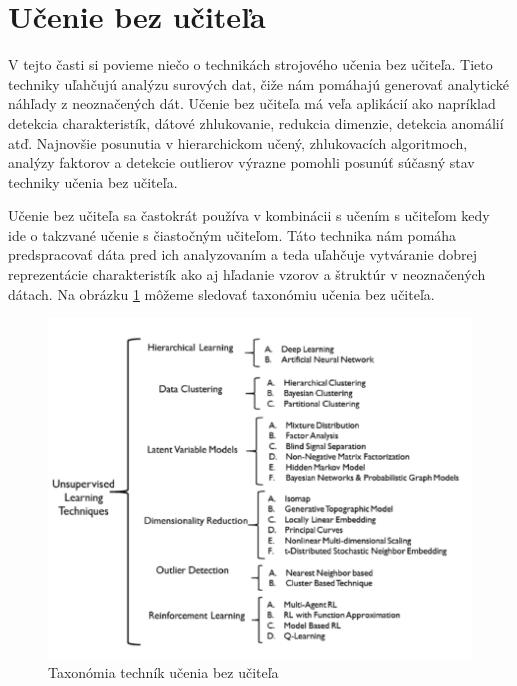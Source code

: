 \section{Učenie bez učiteľa}
V tejto časti si povieme niečo o technikách strojového učenia bez učiteľa. Tieto techniky uľahčujú analýzu surových dat, čiže nám pomáhajú generovať analytické náhľady z neoznačených dát. Učenie bez učiteľa má veľa aplikácií ako napríklad detekcia charakteristík, dátové zhlukovanie, redukcia dimenzie, detekcia anomálií atď. Najnovšie posunutia v hierarchickom učený, zhlukovacích algoritmoch, analýzy faktorov a detekcie outlierov výrazne pomohli posunúť súčasný stav techniky učenia bez učiteľa.\par
Učenie bez učiteľa sa častokrát používa v kombinácii s učením s učiteľom kedy ide o takzvané učenie s čiastočným učiteľom. Táto technika nám pomáha predspracovať dáta pred ich analyzovaním a teda uľahčuje vytváranie dobrej reprezentácie charakteristík ako aj hľadanie vzorov a štruktúr v neoznačených dátach.
Na obrázku \ref{img:bez_ucitela} môžeme sledovať taxonómiu učenia bez učiteľa.
\begin{figure}[H]
	\begin{center}
		\includegraphics[scale=0.6]{img/tax_bez_ucitela.png}
		\caption{Taxonómia techník učenia bez učiteľa}
		\label{img:bez_ucitela}
	\end{center}
\end{figure}
